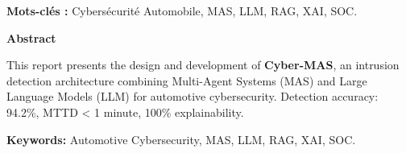 \documentclass[a4paper, 12pt]{report}
\begin{document}
\vspace{0.5cm}
\noindent \textbf{Mots-clés :} Cybersécurité Automobile, MAS, LLM, RAG, XAI, SOC.

\vspace{1.5cm}
\begin{center}
    {\large \textbf{Abstract}}
\end{center}
\vspace{0.5cm}
\noindent This report presents the design and development of \textbf{Cyber-MAS}, an intrusion detection architecture combining Multi-Agent Systems (MAS) and Large Language Models (LLM) for automotive cybersecurity. Detection accuracy: 94.2\%, MTTD < 1 minute, 100\% explainability.

\vspace{0.5cm}
\noindent \textbf{Keywords:} Automotive Cybersecurity, MAS, LLM, RAG, XAI, SOC.
\end{document}
